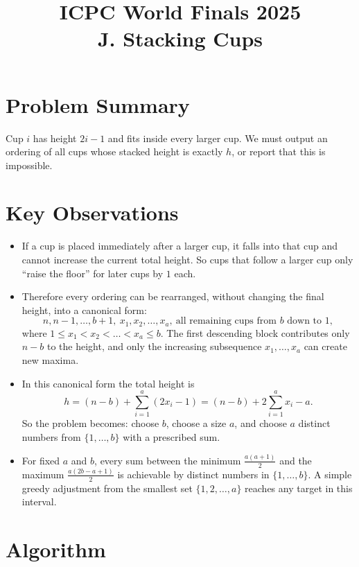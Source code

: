 \documentclass[11pt]{article}
\title{ICPC World Finals 2025\\J. Stacking Cups}
\author{}
\date{}
\begin{document}
\maketitle

\section*{Problem Summary}

Cup $i$ has height $2i-1$ and fits inside every larger cup. We must output an ordering of all cups whose
stacked height is exactly $h$, or report that this is impossible.

\section*{Key Observations}

\begin{itemize}[leftmargin=*]
    \item If a cup is placed immediately after a larger cup, it falls into that cup and cannot increase the
    current total height. So cups that follow a larger cup only ``raise the floor'' for later cups by $1$ each.
    \item Therefore every ordering can be rearranged, without changing the final height, into a canonical
    form:
    \[
    n,n-1,\dots,b+1,\ x_1,x_2,\dots,x_a,\ \text{all remaining cups from }b\text{ down to }1,
    \]
    where $1 \le x_1 < x_2 < \dots < x_a \le b$.
    The first descending block contributes only $n-b$ to the height, and only the increasing subsequence
    $x_1,\dots,x_a$ can create new maxima.
    \item In this canonical form the total height is
    \[
    h = (n-b) + \sum_{i=1}^{a}(2x_i-1)
      = (n-b) + 2\sum_{i=1}^{a}x_i - a.
    \]
    So the problem becomes: choose $b$, choose a size $a$, and choose $a$ distinct numbers from
    $\{1,\dots,b\}$ with a prescribed sum.
    \item For fixed $a$ and $b$, every sum between the minimum
    $\frac{a(a+1)}{2}$ and the maximum
    $\frac{a(2b-a+1)}{2}$
    is achievable by distinct numbers in $\{1,\dots,b\}$.
    A simple greedy adjustment from the smallest set
    $\{1,2,\dots,a\}$ reaches any target in this interval.
\end{itemize}

\section*{Algorithm}
\end{document}
